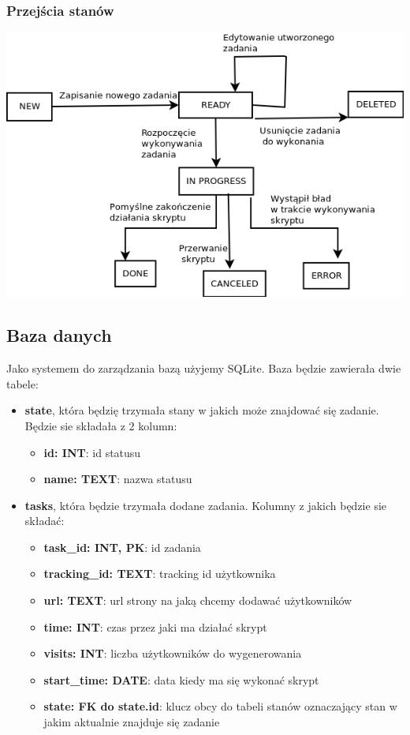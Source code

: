 \documentclass{article}
\begin{document}
\subsubsection{Przejścia stanów}
\begin{center}\includegraphics[scale=0.5]{states_diagram}\end{center}

\subsection{Baza danych}

Jako systemem do zarządzania bazą użyjemy SQLite. Baza będzie zawierała dwie tabele:
\begin{itemize}
\item \textbf{state}, która będzię trzymała stany w jakich może znajdować się zadanie. Będzie sie składała z 2 kolumn:
\begin{itemize}
\item \textbf{id: INT}: id statusu
\item \textbf{name: TEXT}: nazwa statusu
\end{itemize}
\item \textbf{tasks}, która będzie trzymała dodane zadania. Kolumny z jakich będzie sie składać:
\begin{itemize}
\item \textbf{task\_id: INT, PK}: id zadania
\item \textbf{tracking\_id: TEXT}: tracking id użytkownika
\item \textbf{url: TEXT}: url strony na jaką chcemy dodawać użytkowników
\item \textbf{time: INT}: czas przez jaki ma działać skrypt
\item \textbf{visits: INT}: liczba użytkowników do wygenerowania
\item \textbf{start\_time: DATE}: data kiedy ma się wykonać skrypt
\item \textbf{state: FK do state.id}: klucz obcy do tabeli stanów oznaczający stan w jakim aktualnie znajduje się zadanie
\end{itemize}
\end{itemize} 
\end{document}
